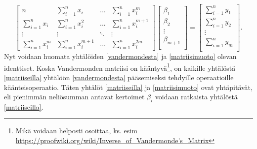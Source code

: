 \documentclass[12pt,a4paper,titlepage]{article}
\begin{document}
\begin{equation}\label{vandermondesta}
	\begin{bmatrix}
		n & \sum\limits_{i=1}^{n} x_i & ... & \sum\limits_{i=1}^{n} x_i^{m} \\
		\sum\limits_{i=1}^{n} x_i & \sum\limits_{i=1}^{n} x_i^2 & ... & \sum\limits_{i=1}^{n} x_i^{m+1} \\
		\vdots & \vdots & \ddots  & \vdots \\
		\sum\limits_{i=1}^{n} x_i^{m} & \sum\limits_{i=1}^{n} x_i^{m+1} & ... & \sum\limits_{i=1}^{n} x_i^{2m}
	\end{bmatrix}
	\begin{bmatrix}
		\beta_1 \\
		\beta_2 \\
		\vdots \\
		\beta_{m+1} \\
	\end{bmatrix}
	=
	\begin{bmatrix}
		\sum\limits_{i=1}^n y_1 \\
		\sum\limits_{i=1}^n y_2 \\
		\vdots \\
		\sum\limits_{i=1}^n y_{m} \\
	\end{bmatrix}.
\end{equation}
Nyt voidaan huomata yhtälöiden \ref{vandermondesta} ja \ref{matriisimuoto} olevan identtiset. Koska Vandermonden matriisi on kääntyvä\footnote{Mikä voidaan helposti osoittaa, ks. esim \url{https://proofwiki.org/wiki/Inverse_of_Vandermonde's_Matrix}}, on kaikille yhtälöstä \ref{matriiseilla} yhtälöön \ref{vandermondesta} pääsemiseksi tehdyille operaatioille käänteisoperaatio. Täten yhtälöt \ref{matriiseilla} ja \ref{matriisimuoto} ovat yhtäpitävät, eli pienimmän neliösumman antavat kertoimet $\beta_i$ voidaan ratkaista yhtälöstä \ref{matriiseilla}.
\end{document}
